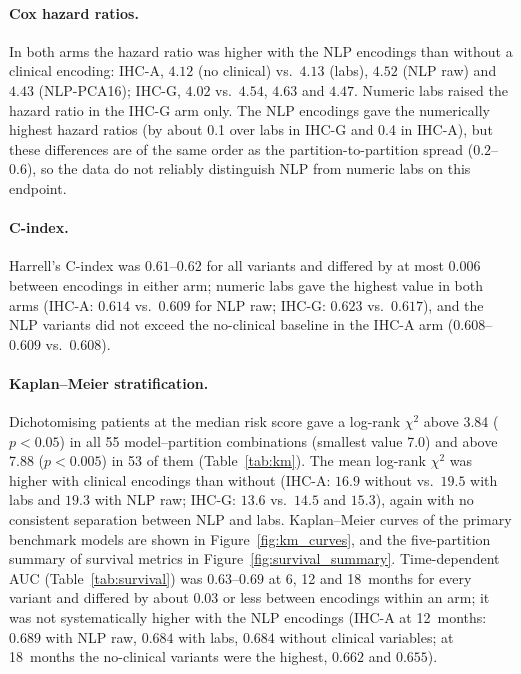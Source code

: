 \paragraph{Cox hazard ratios.}
In both arms the hazard ratio was higher with the NLP encodings than without a clinical encoding:
IHC-A, $4.12$ (no clinical) vs.\ $4.13$ (labs), $4.52$ (NLP raw) and $4.43$ (NLP-PCA16);
IHC-G, $4.02$ vs.\ $4.54$, $4.63$ and $4.47$.
Numeric labs raised the hazard ratio in the IHC-G arm only.
The NLP encodings gave the numerically highest hazard ratios (by about 0.1 over labs in IHC-G and 0.4 in IHC-A),
but these differences are of the same order as the partition-to-partition spread
($0.2$--$0.6$), so the data do not reliably distinguish NLP from numeric labs on this endpoint.

\paragraph{C-index.}
Harrell's C-index was $0.61$--$0.62$ for all variants and differed by at most $0.006$
between encodings in either arm; numeric labs gave the highest value in both arms
(IHC-A: $0.614$ vs.\ $0.609$ for NLP raw; IHC-G: $0.623$ vs.\ $0.617$), and the NLP variants did not exceed the no-clinical
baseline in the IHC-A arm ($0.608$--$0.609$ vs.\ $0.608$).

\paragraph{Kaplan--Meier stratification.}
Dichotomising patients at the median risk score gave a log-rank $\chi^2$ above 3.84
($p < 0.05$) in all 55 model--partition combinations (smallest value 7.0) and above 7.88
($p < 0.005$) in 53 of them (Table~\ref{tab:km}).
The mean log-rank $\chi^2$ was higher with clinical encodings than without
(IHC-A: $16.9$ without vs.\ $19.5$ with labs and $19.3$ with NLP raw; IHC-G: $13.6$ vs.\ $14.5$
and $15.3$), again with no consistent separation between NLP and labs.
Kaplan--Meier curves of the primary benchmark models are shown in
Figure~\ref{fig:km_curves}, and the five-partition summary of survival metrics in
Figure~\ref{fig:survival_summary}.
Time-dependent AUC (Table~\ref{tab:survival}) was $0.63$--$0.69$ at 6, 12 and 18~months for every variant
and differed by about $0.03$ or less between encodings within an arm; it was not systematically higher with the
NLP encodings (IHC-A at 12~months: $0.689$ with NLP raw, $0.684$ with labs, $0.684$ without clinical
variables; at 18~months the no-clinical variants were the highest, $0.662$ and $0.655$).

